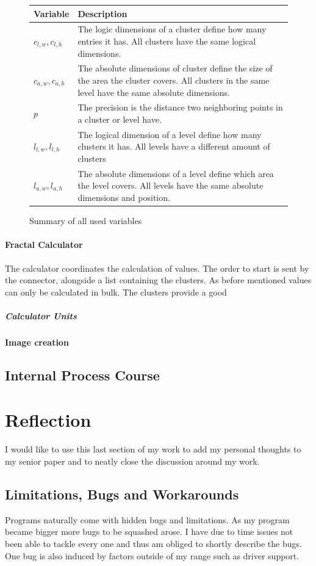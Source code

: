 \documentclass[10pt,a4paper,titlepage]{article}
\begin{document}
	\begin{figure}
		\centering
		\caption{Summary of all used variables}
		\label{fig:messy_table}
		\begin{tabular}{|l|p{}|}
			\hline
			Variable        & Description \\ \hline
			\(c_{l,w},c_{l,h}\)  & The logic dimensions of a cluster define how many entries it has. All clusters have the same logical dimensions.\\ \hline
			\(c_{a,w},c_{a,h}\)  & The absolute dimensions of cluster define the size of the area the cluster covers. All clusters in the same level have the same absolute dimensions.\\ \hline
			\(p\)                & The precision is the distance two neighboring points in a cluster or level have.\\ \hline
			\(l_{l,w}, l_{l,h}\) & The logical dimension of a level define how many clusters it has. All levels have a different amount of clusters \\ \hline
			\(l_{a,w},l_{a,h}\)  & The absolute dimensions of a level define which area the level covers. All levels have the same absolute dimensions and position.     \\ \hline
		\end{tabular}
	\end{figure}
	\paragraph{Fractal Calculator}
	The calculator coordinates the calculation of values. The order to start is sent by the connector, alongside a list containing the clusters. As before mentioned values can only be calculated in bulk. The clusters provide a good 
	\subparagraph{Calculator Units}
	\paragraph{Image creation}
	\subsection{Internal Process Course}
	\section{Reflection}
	I would like to use this last section of my work to add my personal thoughts to my senior paper and to neatly close the discussion around my work.
	\subsection{Limitations, Bugs and Workarounds}
	Programs naturally come with hidden bugs and limitations. As my program became bigger more bugs to be squashed arose. I have due to time issues not been able to tackle every one and thus am obliged to shortly describe the bugs. One bug is also induced by factors outside of my range such as driver support.
\end{document}
